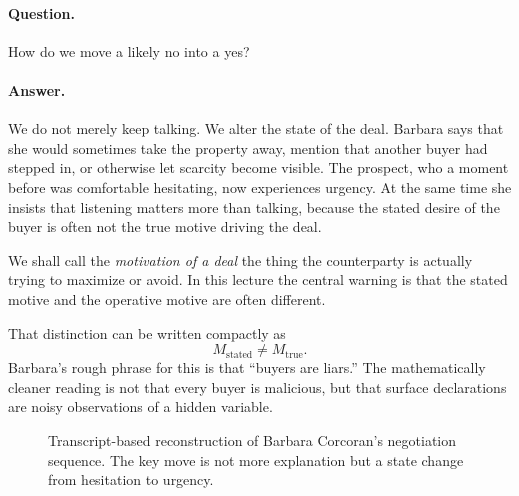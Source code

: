 \paragraph{Question.} How do we move a likely no into a yes?

\paragraph{Answer.} We do not merely keep talking. We alter the state of the deal. Barbara says that she would sometimes take the property away, mention that another buyer had stepped in, or otherwise let scarcity become visible. The prospect, who a moment before was comfortable hesitating, now experiences urgency. At the same time she insists that listening matters more than talking, because the stated desire of the buyer is often not the true motive driving the deal.

\begin{definition}
We shall call the \emph{motivation of a deal} the thing the counterparty is actually trying to maximize or avoid. In this lecture the central warning is that the stated motive and the operative motive are often different.
\end{definition}

That distinction can be written compactly as
\begin{equation}
M_{\text{stated}} \neq M_{\text{true}}.
\end{equation}
Barbara's rough phrase for this is that ``buyers are liars.'' The mathematically cleaner reading is not that every buyer is malicious, but that surface declarations are noisy observations of a hidden variable.

\begin{figure}[h]
\centering
{}
\caption{Transcript-based reconstruction of Barbara Corcoran's negotiation sequence. The key move is not more explanation but a state change from hesitation to urgency.}
\end{figure}

